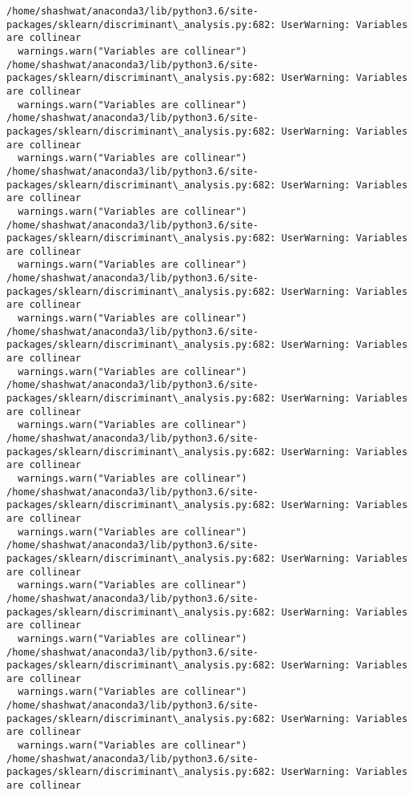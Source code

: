 \documentclass[11pt]{article}
\begin{document}
    \begin{Verbatim}[commandchars=\\\{\}]
/home/shashwat/anaconda3/lib/python3.6/site-packages/sklearn/discriminant\_analysis.py:682: UserWarning: Variables are collinear
  warnings.warn("Variables are collinear")
/home/shashwat/anaconda3/lib/python3.6/site-packages/sklearn/discriminant\_analysis.py:682: UserWarning: Variables are collinear
  warnings.warn("Variables are collinear")
/home/shashwat/anaconda3/lib/python3.6/site-packages/sklearn/discriminant\_analysis.py:682: UserWarning: Variables are collinear
  warnings.warn("Variables are collinear")
/home/shashwat/anaconda3/lib/python3.6/site-packages/sklearn/discriminant\_analysis.py:682: UserWarning: Variables are collinear
  warnings.warn("Variables are collinear")
/home/shashwat/anaconda3/lib/python3.6/site-packages/sklearn/discriminant\_analysis.py:682: UserWarning: Variables are collinear
  warnings.warn("Variables are collinear")
/home/shashwat/anaconda3/lib/python3.6/site-packages/sklearn/discriminant\_analysis.py:682: UserWarning: Variables are collinear
  warnings.warn("Variables are collinear")
/home/shashwat/anaconda3/lib/python3.6/site-packages/sklearn/discriminant\_analysis.py:682: UserWarning: Variables are collinear
  warnings.warn("Variables are collinear")
/home/shashwat/anaconda3/lib/python3.6/site-packages/sklearn/discriminant\_analysis.py:682: UserWarning: Variables are collinear
  warnings.warn("Variables are collinear")
/home/shashwat/anaconda3/lib/python3.6/site-packages/sklearn/discriminant\_analysis.py:682: UserWarning: Variables are collinear
  warnings.warn("Variables are collinear")
/home/shashwat/anaconda3/lib/python3.6/site-packages/sklearn/discriminant\_analysis.py:682: UserWarning: Variables are collinear
  warnings.warn("Variables are collinear")
/home/shashwat/anaconda3/lib/python3.6/site-packages/sklearn/discriminant\_analysis.py:682: UserWarning: Variables are collinear
  warnings.warn("Variables are collinear")
/home/shashwat/anaconda3/lib/python3.6/site-packages/sklearn/discriminant\_analysis.py:682: UserWarning: Variables are collinear
  warnings.warn("Variables are collinear")
/home/shashwat/anaconda3/lib/python3.6/site-packages/sklearn/discriminant\_analysis.py:682: UserWarning: Variables are collinear
  warnings.warn("Variables are collinear")
/home/shashwat/anaconda3/lib/python3.6/site-packages/sklearn/discriminant\_analysis.py:682: UserWarning: Variables are collinear
  warnings.warn("Variables are collinear")
/home/shashwat/anaconda3/lib/python3.6/site-packages/sklearn/discriminant\_analysis.py:682: UserWarning: Variables are collinear

\end{Verbatim}
\end{document}
